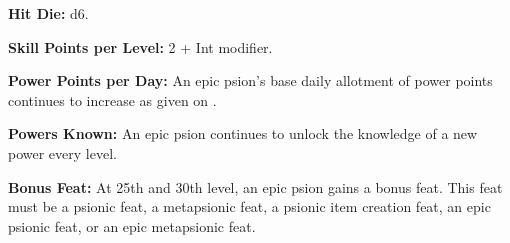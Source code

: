 
\textbf{Hit Die:} d6.

\textbf{Skill Points per Level:} 2 + Int modifier.

\textbf{Power Points per Day:} An epic psion's base daily allotment of power points continues to increase as given on .

\textbf{Powers Known:} An epic psion continues to unlock the knowledge of a new power every level.

\textbf{Bonus Feat:} At 25th and 30th level, an epic psion gains a bonus feat. This feat must be a psionic feat, a metapsionic feat, a psionic item creation feat, an epic psionic feat, or an epic metapsionic feat.












